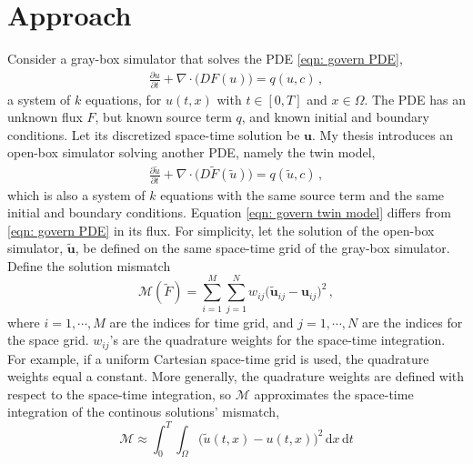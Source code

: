 \section{Approach}
\label{infer}
Consider a gray-box simulator that solves the PDE \eqref{eqn: govern PDE}, 
\begin{equation*}\begin{split}
    \frac{\partial u}{\partial t}+ \nabla \cdot \big( D F(u) \big) = q(u,c)\,,
\end{split}
\end{equation*}
a system of $k$ equations, for $u(t,x)$ with $t\in[0,T]$
and $x\in\Omega$. The PDE has an unknown flux $F$, but known source term $q$, and
known initial and boundary conditions.
Let its discretized space-time solution be $\boldsymbol{u}$.
My thesis introduces an open-box simulator solving another PDE, namely the twin model,
\begin{equation}\begin{split}
    \frac{\partial \tilde{u}}{\partial t}+ \nabla \cdot \big(D \tilde{F}(\tilde{u})\big) = q(\tilde{u},c)\,,
\end{split}
\label{eqn: govern twin model}
\end{equation}
which is also a system of $k$ equations
with the same source term and the same initial and boundary conditions. 
Equation \eqref{eqn: govern twin model}
differs from \eqref{eqn: govern PDE} in its flux. For simplicity, 
let the solution of the open-box simulator, $\tilde{\boldsymbol{u}}$, be defined on the same space-time
grid of the gray-box simulator.
Define the solution mismatch
\begin{equation}
    \mathcal{M}(\tilde{F}) = \sum_{i=1}^M \sum_{j=1}^N w_{ij} \big( \tilde{\boldsymbol{u}}_{ij}
     -\boldsymbol{u}_{ij}\big)^2 \,,
    \label{eqn: solution mismatch}
\end{equation}
where $i=1,\cdots, M$ are the indices for time grid, and $j=1,\cdots, N$ are the indices for the space grid.
$w_{ij}$'s are the quadrature weights for the space-time integration. 
For example, if a uniform Cartesian space-time grid is used, the quadrature weights equal a constant.
More generally, the quadrature weights are defined with respect to the space-time integration, so
$\mathcal{M}$ approximates the space-time integration of the continous solutions' mismatch,
\begin{equation}
\mathcal{M} \approx \int_{0}^T\int_\Omega \big(\tilde{u}(t,x) - u(t,x)\big)^2 \, \textrm{d}x\,\textrm{d}t
\end{equation}
